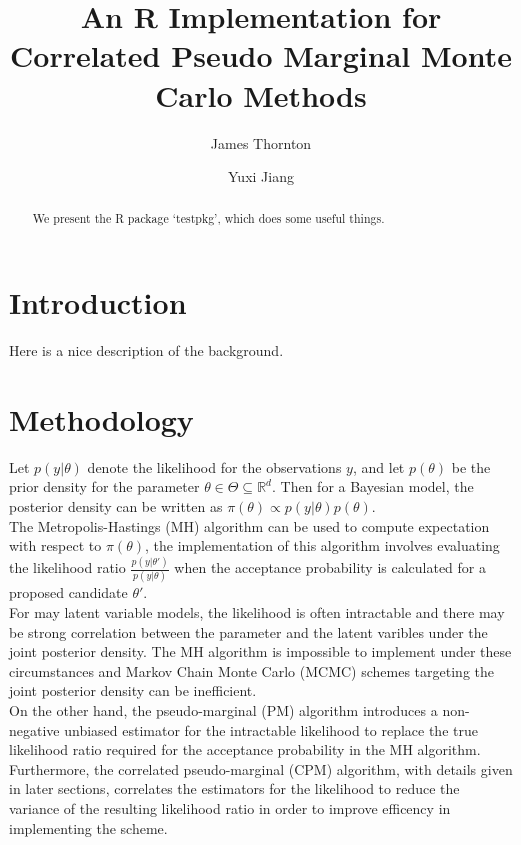 \documentclass{article}
\title{An R Implementation for Correlated Pseudo Marginal Monte Carlo Methods}
\author{James Thornton \and Yuxi Jiang}
\begin{document}



  \maketitle

  \begin{abstract}
  We present the R package `testpkg', which does some useful things.
  \end{abstract}

  \section{Introduction}

  Here is a nice description of the background.





  \section{Methodology}

  Let $p(y|\theta)$ denote the likelihood for the observations $y$, and let $p(\theta)$ be the prior density for the parameter $\theta \in \Theta \subseteq \mathbb{R}^{d}$. Then for a Bayesian model, the posterior density can be written as $\pi (\theta) \propto p(y|\theta) p(\theta)$. \\

  The Metropolis-Hastings (MH) algorithm can be used to compute expectation with respect to $\pi(\theta)$, the implementation of this algorithm involves evaluating the likelihood ratio $\frac{p(y| \theta')}{p(y| \theta)}$ when the acceptance probability is calculated for a proposed candidate $\theta'$. \\

  For may latent variable models, the likelihood is often intractable and there may be strong correlation between the parameter and the latent varibles under the joint posterior density. The MH algorithm is impossible to implement under these circumstances and Markov Chain Monte Carlo (MCMC) schemes targeting the joint posterior density can be inefficient. \\

  On the other hand, the pseudo-marginal (PM) algorithm introduces a non-negative unbiased estimator for the intractable likelihood to replace the true likelihood ratio required for the acceptance probability in the MH algorithm. Furthermore, the correlated pseudo-marginal (CPM) algorithm, with details given in later sections, correlates the estimators for the likelihood to reduce the variance of the resulting likelihood ratio in order to improve efficency in implementing the scheme.
\end{document}
